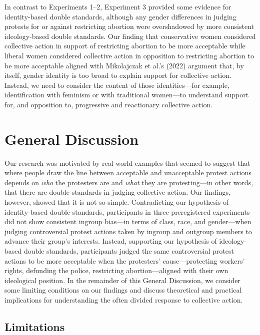 \documentclass[twocolumn, 11pt, letterpaper]{article}
\begin{document}
In contrast to Experiments 1--2, Experiment 3 provided some evidence for
identity-based double standards, although any gender differences in
judging protests for or against restricting abortion were overshadowed
by more consistent ideology-based double standards. Our finding that
conservative women considered collective action in support of
restricting abortion to be more acceptable while liberal women
considered collective action in opposition to restricting abortion to be
more acceptable aligned with Mikolajczak et al.'s (2022) argument that,
by itself, gender identity is too broad to explain support for
collective action. Instead, we need to consider the content of those
identities---for example, identification with feminism or with
traditional women---to understand support for, and opposition to,
progressive and reactionary collective action.

\hypertarget{general-discussion}{%
\section{General Discussion}\label{general-discussion}}

Our research was motivated by real-world examples that seemed to suggest
that where people draw the line between acceptable and unacceptable
protest actions depends on \emph{who} the protesters are and \emph{what}
they are protesting---in other words, that there are double standards in
judging collective action. Our findings, however, showed that it is not
so simple. Contradicting our hypothesis of identity-based double
standards, participants in three preregistered experiments did not show
consistent ingroup bias---in terms of class, race, and gender---when
judging controversial protest actions taken by ingroup and outgroup
members to advance their group's interests. Instead, supporting our
hypothesis of ideology-based double standards, participants judged the
same controversial protest actions to be more acceptable when the
protesters' cause---protecting workers' rights, defunding the police,
restricting abortion---aligned with their own ideological position. In
the remainder of this General Discussion, we consider some limiting
conditions on our findings and discuss theoretical and practical
implications for understanding the often divided response to collective
action.

\hypertarget{limitations}{%
\subsection{Limitations}\label{limitations}}
\end{document}

